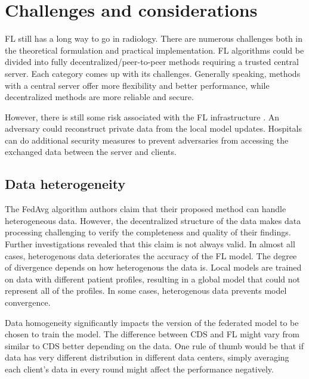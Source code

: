 \section{Challenges and considerations}
\label{sec:others}

FL still has a long way to go in radiology. There are numerous challenges both in the theoretical formulation and practical implementation. FL algorithms could be divided into fully decentralized/peer-to-peer methods requiring a trusted central server. Each category comes up with its challenges. Generally speaking, methods with a central server offer more flexibility and better performance, while decentralized methods are more reliable and secure.

However, there is still some risk associated with the FL infrastructure \cite{yin2021see}. An adversary could reconstruct private data from the local model updates\cite{wang2019beyond}. Hospitals can do additional security measures to prevent adversaries from accessing the exchanged data between the server and clients.



\subsection{Data heterogeneity }


The FedAvg algorithm authors claim that their proposed method can handle heterogeneous data. However, the decentralized structure of the data makes data processing challenging to verify the completeness and quality of their findings. Further investigations revealed that this claim is not always valid\cite{li2020federated}. In almost all cases, heterogenous data deteriorates the accuracy of the FL model. The degree of divergence depends on how heterogenous the data is. Local models are trained on data with different patient profiles, resulting in a global model that could not represent all of the profiles. In some cases, heterogenous data prevents model convergence.    


Data homogeneity significantly impacts the version of the federated model to be chosen to train the model. The difference between CDS and FL might vary from similar to CDS better depending on the data. One rule of thumb would be that if data has very different distribution in different data centers, simply averaging each client's data in every round might affect the performance negatively.



